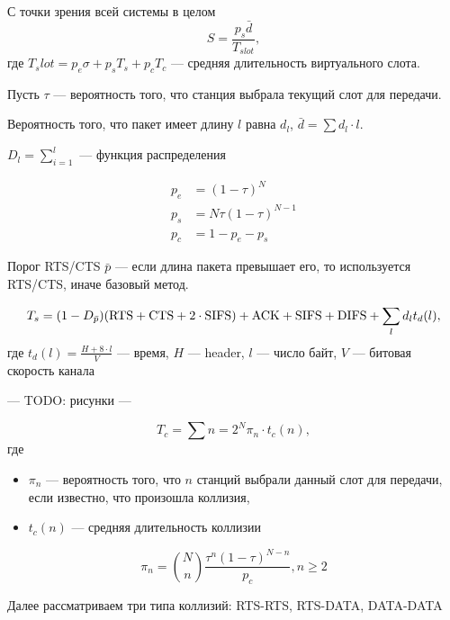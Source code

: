 С точки зрения всей системы в целом
\[ S = \frac{p_s \bar{d}}{T_{slot}}, \]
где $T_slot = p_e \sigma + p_s T_s + p_c T_c$ --- средняя длительность виртуального слота.

Пусть $\tau$ --- вероятность того, что станция выбрала текущий слот для передачи.

Вероятность того, что пакет имеет длину $l$ равна $d_l$, $\bar{d} = \sum d_l \cdot l$.

$D_l = \sum\limits_{i = 1}^{l}$ --- функция распределения


\begin{align*}
p_e &= (1 - \tau)^N \\
p_s &= N \tau (1 - \tau)^{N - 1} \\
p_c &= 1 - p_e - p_s
\end{align*}

Порог RTS/CTS $\bar{p}$ --- если длина пакета превышает его, то используется RTS/CTS, иначе базовый метод.

\[
T_s = (1 - D_{\bar{p}}) (\text{RTS} + \text{CTS} + 2 \cdot \text{SIFS}) +
\text{ACK} + \text{SIFS} + \text{DIFS} + \sum_l d_l t_d(l),
\]
где $t_d(l) = \frac{H + 8 \cdot l}{V}$ --- время, $H$ --- header, $l$ --- число байт, $V$ --- битовая скорость канала

--- TODO: рисунки ---

\[
T_c = \sum{n=2}^N \pi_n \cdot t_c(n),
\]
где
\begin{itemize}
\item $\pi_n$ --- вероятность того, что $n$ станций выбрали данный слот для передачи, если известно, что произошла коллизия,
\item $t_c(n)$ --- средняя длительность коллизии
\end{itemize}

\[
\pi_n = {N \choose n} \frac{\tau^n (1 - \tau)^{N - n}}{p_c}, n \geq 2
\]

Далее рассматриваем три типа коллизий: RTS-RTS, RTS-DATA, DATA-DATA

